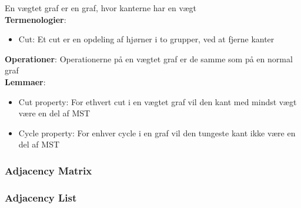 En vægtet graf er en graf, hvor kanterne har en vægt\\
\textbf{Termenologier}:
\begin{itemize}
	\item Cut: Et cut er en opdeling af hjørner i to grupper, ved at fjerne kanter
\end{itemize}
\textbf{Operationer}: Operationerne på en vægtet graf er de samme som på en normal graf\\
\textbf{Lemmaer}:
\begin{itemize}
	\item Cut property: For ethvert cut i en vægtet graf vil den kant med mindst vægt være en del af MST
	\item Cycle property: For enhver cycle i en graf vil den tungeste kant ikke være en del af MST
\end{itemize}

\subsubsection{Adjacency Matrix}


\subsubsection{Adjacency List}
